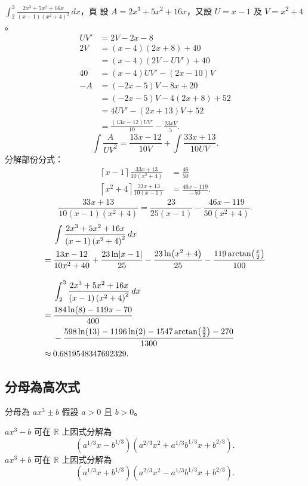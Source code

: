 \documentclass{beamer}
\newcommand{\Left} {\mathopen{}\mathclose\bgroup\left}
\newcommand{\Right}{\aftergroup\egroup\right}
\newcommand{\R}{\mathbb R}
\theoremstyle{remark}
\begin{document}
\begin{CJK}{UTF8}{bsmi}
\begin{frame}[allowframebreaks]{$\displaystyle \int_2^3 \frac{2x^3 + 5x^2 + 16x}
    {(x-1) \left( x^2 + 4 \right)^2}\,dx$，頁}
  設 $A = 2x^3 + 5x^2 + 16x$，又設 $U = x-1$ 及 $V = x^2 + 4$。
  \begin{align*}
    UV' &= 2V - 2x - 8\\
    2V  &= (x - 4) \left( 2x + 8 \right) + 40\\
	&= (x - 4) \left( 2V - UV' \right) + 40\\
    40  &= \left( x - 4 \right) UV' - \left( 2x - 10 \right) V\\
    -A  &= \left( -2x - 5 \right) V - 8x + 20\\
	&= \left( -2x - 5 \right) V - 4 \left( 2x + 8 \right) + 52\\
	&= 4UV' - \left( 2x + 13 \right) V + 52\\
	&= \frac{\left( 13x - 12 \right) UV'}{10} - \frac{23xV}{5}.
  \end{align*}
  \[\int \frac{A}{UV^2} = \frac{13x - 12}{10V} + \int \frac{33x + 13}{10UV}.\]
  分解部份分式：
  \begin{align*}
    \left\lceil x - 1 \right\rceil   \frac{33x + 13}{10 \left( x^2 + 4 \right)} &= \frac{46}{50}\\
    \left\lceil x^2 + 4 \right\rceil \frac{33x + 13}{10 \left( x   - 1 \right)} &= \frac{46x - 119}{-50}.
  \end{align*}
  \[\frac{33x + 13}{10 \left( x   - 1 \right) \left( x^2 + 4 \right)} = \frac{23}{25 \left( x - 1 \right)}
    -\frac{46x - 119}{50 \left( x^2 + 4 \right)}.\]
  \begin{align*}
       & \int \frac{2x^3 + 5x^2 + 16x}{(x-1) \left( x^2 + 4 \right)^2}\,dx\\
    =\:& \frac{13x - 12}{10x^2 + 40} + \frac{23 \ln \Left| x - 1 \Right|}{25} - \frac{23 \ln \Left( x^2 + 4 \Right)}{25}
	 -\frac{119 \arctan \Left( \frac x 2 \Right)}{100}\\[1em]
       & \int_2^3 \frac{2x^3 + 5x^2 + 16x}{(x-1) \left( x^2 + 4 \right)^2}\,dx\\
    =\:& \frac{184\ln(8) - 119\pi - 70}{400}\\
    \phantom=\:& -\frac{598\ln(13) - 1196\ln(2) - 1547 \arctan \Left( \frac32 \Right) - 270}{1300}\\
    \approx\:& 0.6819548347692329.
  \end{align*}
\end{frame}

\subsection{分母為高次式}
\begin{frame}{分母為 $ax^3 \pm b$}
  假設 $a > 0$ 且 $b > 0$。
  \begin{theorem}
    $ax^3 - b$ 可在 $\R$ 上因式分解為
    \[\left( a^{1/3}x - b^{1/3} \right) \left( a^{2/3}x^2 + a^{1/3} b^{1/3} x + b^{2/3} \right).\]
    $ax^3 + b$ 可在 $\R$ 上因式分解為
    \[\left( a^{1/3}x + b^{1/3} \right) \left( a^{2/3}x^2 - a^{1/3} b^{1/3} x + b^{2/3} \right).\]
  \end{theorem}
\end{frame}


\end{CJK}
\end{document}
